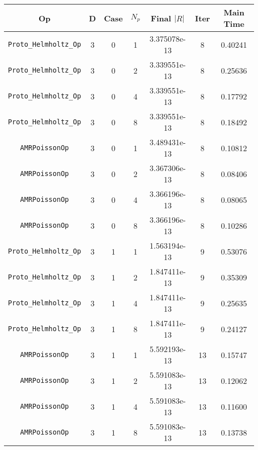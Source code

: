 \documentclass{article}
\begin{document}
\begin{small}
\begin{table}
\begin{center}
\begin{tabular}{|c|c|c|c|c|c||c|} \hline
 Op & D & Case & $N_p$ & Final $|R|$  &  Iter & Main Time \\
\hline
 {\tt Proto\_Helmholtz\_Op} & 3 & 0 &   1    & 3.375078e-13   &  8    &  0.40241  \\
 {\tt Proto\_Helmholtz\_Op} & 3 & 0 &   2    & 3.339551e-13   &  8    &  0.25636  \\
 {\tt Proto\_Helmholtz\_Op} & 3 & 0 &   4    & 3.339551e-13   &  8    &  0.17792  \\
 {\tt Proto\_Helmholtz\_Op} & 3 & 0 &   8    & 3.339551e-13   &  8    &  0.18492  \\
\hline                                                                               
 {\tt AMRPoissonOp}         & 3 & 0   & 1    & 3.489431e-13   &   8   & 0.10812    \\
 {\tt AMRPoissonOp}         & 3 & 0   & 2    & 3.367306e-13   &   8   & 0.08406    \\
 {\tt AMRPoissonOp}         & 3 & 0   & 4    & 3.366196e-13   &   8   & 0.08065    \\
 {\tt AMRPoissonOp}         & 3 & 0   & 8    & 3.366196e-13   &   8   & 0.10286    \\
\hline                                                                                     
 {\tt Proto\_Helmholtz\_Op} & 3 & 1   & 1    & 1.563194e-13   &   9   & 0.53076   \\
 {\tt Proto\_Helmholtz\_Op} & 3 & 1   & 2    & 1.847411e-13   &   9   & 0.35309   \\
 {\tt Proto\_Helmholtz\_Op} & 3 & 1   & 4    & 1.847411e-13   &   9   & 0.25635   \\
 {\tt Proto\_Helmholtz\_Op} & 3 & 1   & 8    & 1.847411e-13   &   9   & 0.24127   \\
\hline                                                                               
 {\tt AMRPoissonOp}         & 3 & 1   & 1    & 5.592193e-13   &   13   &  0.15747   \\
 {\tt AMRPoissonOp}         & 3 & 1   & 2    & 5.591083e-13   &   13   &  0.12062   \\
 {\tt AMRPoissonOp}         & 3 & 1   & 4    & 5.591083e-13   &   13   &  0.11600   \\
 {\tt AMRPoissonOp}         & 3 & 1   & 8    & 5.591083e-13   &   13   &  0.13738   \\

\end{tabular}
\end{center}
\end{table}
\end{small}
\end{document}

